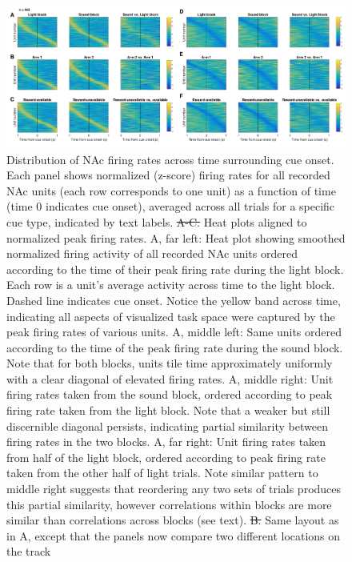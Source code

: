 \documentclass[11pt]{article}
\newcommand{\bsf}[1]{\textbf{#1}}
\providecommand{\DIFadd}[1]{{\protect\color{blue}\uwave{#1}}} %
\providecommand{\DIFdel}[1]{{\protect\color{red}\sout{#1}}}                      %
\providecommand{\DIFaddFL}[1]{\DIFadd{#1}} %
\providecommand{\DIFdelFL}[1]{\DIFdel{#1}} %
\providecommand{\DIFaddbeginFL}{} %
\providecommand{\DIFaddendFL}{} %
\providecommand{\DIFdelbeginFL}{} %
\providecommand{\DIFdelendFL}{} %
\newcommand{\DIFscaledelfig}{0.5}
\newlength{\DIFdelgraphicswidth} %
\newlength{\DIFdelgraphicsheight} %
\newcommand{\DIFaddincludegraphics}[2][]{{\color{blue}\fbox{\DIFOincludegraphics[#1]{#2}}}} %
\newcommand{\DIFdelincludegraphics}[2][]{%
\sbox{\DIFdelgraphicsbox}{\DIFOincludegraphics[#1]{#2}}%
\settoboxwidth{\DIFdelgraphicswidth}{\DIFdelgraphicsbox} %
\settoboxtotalheight{\DIFdelgraphicsheight}{\DIFdelgraphicsbox} %
\scalebox{\DIFscaledelfig}{%
\parbox[b]{\DIFdelgraphicswidth}{\usebox{\DIFdelgraphicsbox}\\[-\baselineskip] \rule{\DIFdelgraphicswidth}{0em}}\llap{\resizebox{\DIFdelgraphicswidth}{\DIFdelgraphicsheight}{%
\setlength{\unitlength}{\DIFdelgraphicswidth}%
\begin{picture}(1,1)%
\thicklines\linethickness{2pt} %
{\color[rgb]{1,0,0}\put(0,0){\framebox(1,1){}}}%
{\color[rgb]{1,0,0}\put(0,0){\line( 1,1){1}}}%
{\color[rgb]{1,0,0}\put(0,1){\line(1,-1){1}}}%
\end{picture}%
}\hspace*{3pt}}} %
} %
\DeclareRobustCommand{\DIFaddbeginFL}{\DIFOaddbeginFL \let\includegraphics\DIFaddincludegraphics} %
\DeclareRobustCommand{\DIFaddendFL}{\DIFOaddendFL \let\includegraphics\DIFOincludegraphics} %
\DeclareRobustCommand{\DIFdelbeginFL}{\DIFOdelbeginFL \let\includegraphics\DIFdelincludegraphics} %
\DeclareRobustCommand{\DIFdelendFL}{\DIFOaddendFL \let\includegraphics\DIFOincludegraphics} %
\begin{document}
{\begin{figure}
[h]
\centering
\includegraphics[height=0.5\textheight]{Fig 8 - Task tiling.png}
\caption{Distribution of NAc firing rates across time surrounding cue
  onset. Each panel shows normalized (z-score) firing rates for all recorded NAc
  units (each row corresponds to one unit) as a function of time (time 0
  indicates cue onset), averaged across all trials for a specific cue type,
  indicated by text labels. \DIFdelbeginFL \DIFdelFL{A-C. }\DIFdelendFL \DIFaddbeginFL \DIFaddFL{\bsf{A-C}: }\DIFaddendFL Heat plots aligned to normalized peak
  firing rates. A, far left: Heat plot showing smoothed normalized firing
  activity of all recorded NAc units ordered according to the time of their peak
  firing rate during the light block. Each row is a unit’s average activity
  across time to the light block. Dashed line indicates cue onset. Notice the
  yellow band across time, indicating all aspects of visualized task space were
  captured by the peak firing rates of various units. A, middle left: Same units
  ordered according to the time of the peak firing rate during the sound
  block. Note that for both blocks, units tile time approximately uniformly with
  a clear diagonal of elevated firing rates. A, middle right: Unit firing rates
  taken from the sound block, ordered according to peak firing rate taken from
  the light block. Note that a weaker but still discernible diagonal persists,
  indicating partial similarity between firing rates in the two blocks. A, far
  right: Unit firing rates taken from half of the light block, ordered according
  to peak firing rate taken from the other half of light trials. Note similar
  pattern to middle right suggests that reordering any two sets of trials
  produces this partial similarity, however correlations within blocks are more
  similar than correlations across blocks (see text). \DIFdelbeginFL \DIFdelFL{B. }\DIFdelendFL \DIFaddbeginFL \DIFaddFL{\bsf{B}: }\DIFaddendFL Same layout as in
  A, except that the panels now compare two different locations on the track
}
\end{figure}}
\end{document}
